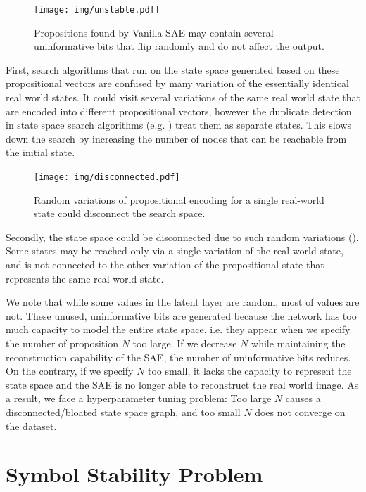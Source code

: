 \begin{figure}[htb]
 \centering
 \texttt{[image: img/unstable.pdf]}
 \caption{Propositions found by Vanilla SAE may contain several uninformative bits
 that flip randomly and do not affect the output.}
 \label{unstable}
\end{figure}

First, search algorithms that run on the state space generated based on these propositional vectors
are confused by many variation of the essentially identical real world states.
It could visit several variations of the same real world state that are encoded into different propositional vectors,
however the duplicate detection in state space search algorithms (e.g. \astar) treat them as separate states.
This slows down the search by increasing the number of nodes that can be reachable from the initial state.

\begin{figure}[htb]
 \centering
 \texttt{[image: img/disconnected.pdf]}
 \caption{Random variations of propositional encoding for a single real-world state could disconnect the search space.}
 \label{disconnected}
\end{figure}

Secondly, the state space could be disconnected due to such random variations ().
Some states may be reached only via a single variation of the real world state, and is not connected to the
other variation of the propositional state that represents the same real-world state.

We note that while some values in the latent layer are random, most of values are not.
These unused, uninformative bits are generated because the network has too much capacity to 
model the entire state space, i.e. they appear when we specify the number of proposition $N$ too large.
If we decrease $N$ while maintaining the reconstruction capability of the SAE, the number of uninformative bits
reduces.
On the contrary, if we specify $N$ too small, it lacks the capacity to represent the state space
and the SAE is no longer able to reconstruct the
real world image.
As a result, we face a hyperparameter tuning problem: Too large $N$ causes a disconnected/bloated state space graph,
and too small $N$ does not converge on the dataset.

\section{Symbol Stability Problem}

